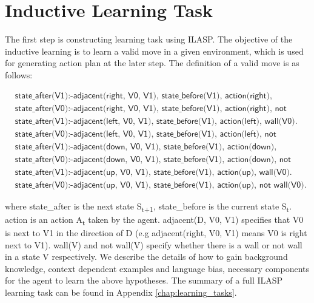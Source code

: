 \section{Inductive Learning Task}
\label{sec:inductive_learning_task}
The first step is constructing learning task using ILASP. The objective of the inductive learning is to learn a valid move in a given environment, which is used for generating action plan at the later step.
The definition of a valid move is as follows:

\begin{equation}
\begin{split}
&\textsf{state\_after(V1):-adjacent(right, V0, V1), state\_before(V1), action(right), wall(V0).}\\
&\textsf{state\_after(V0):-adjacent(right, V0, V1), state\_before(V1), action(right), not wall(V0).}\\
&\textsf{state\_after(V1):-adjacent(left, V0, V1), state\_before(V1), action(left), wall(V0).}\\
&\textsf{state\_after(V0):-adjacent(left, V0, V1), state\_before(V1), action(left), not wall(V0).}\\
&\textsf{state\_after(V1):-adjacent(down, V0, V1), state\_before(V1), action(down), wall(V0).}\\
&\textsf{state\_after(V0):-adjacent(down, V0, V1), state\_before(V1), action(down), not wall(V0).}\\
&\textsf{state\_after(V1):-adjacent(up, V0, V1), state\_before(V1),  action(up), wall(V0).}\\
&\textsf{state\_after(V0):-adjacent(up, V0, V1), state\_before(V1), action(up), not wall(V0).}
\end{split}
\label{target_hypothesis}
\end{equation}

where \textsf{state\_after} is the next state S\textsubscript{t+1}, \textsf{state\_before} is the current state S\textsubscript{t}. \textsf{action} is an action A\textsubscript{t} taken by the agent.
\textsf{adjacent(D, V0, V1)} specifies that V0 is next to V1 in the direction of D (e.g \textsf{adjacent(right, V0, V1)} means V0 is right next to V1). 
\textsf{wall(V)} and \textsf{not wall(V)} specify whether there is a wall or not wall in a state V respectively.
We describe the details of how to gain background knowledge, context dependent examples and language bias, necessary components for the agent to learn the above hypotheses.
The summary of a full ILASP learning task can be found in Appendix \ref{chap:learning_tasks}.

